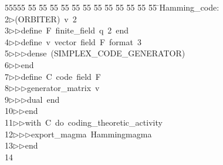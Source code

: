%
%
\begin{tabbing}
55555 \= 55 \= 55 \= 55 \= 55 \= 55 \= 55 \= 55 \= 55 \= 55 \= 55 \= 55 \= 55 \= \>Hamming\_code:\\[0pt]
2\>$\triangleright$\>(ORBITER)\ v\ 2\ \\[0pt]
3\>$\triangleright$\>$\triangleright$\>define\ F\ finite\_field\ q\ 2\ end\ \\[0pt]
4\>$\triangleright$\>$\triangleright$\>define\ v\ vector\ field\ F\ format\ 3\ \\[0pt]
5\>$\triangleright$\>$\triangleright$\>$\triangleright$\>dense\ (SIMPLEX\_CODE\_GENERATOR)\ \\[0pt]
6\>$\triangleright$\>$\triangleright$\>end\ \\[0pt]
7\>$\triangleright$\>$\triangleright$\>define\ C\ code\ field\ F\ \\[0pt]
8\>$\triangleright$\>$\triangleright$\>$\triangleright$\>generator\_matrix\ v\ \\[0pt]
9\>$\triangleright$\>$\triangleright$\>$\triangleright$\>dual\ end\ \\[0pt]
10\>$\triangleright$\>$\triangleright$\>end\ \\[0pt]
11\>$\triangleright$\>$\triangleright$\>with\ C\ do\ coding\_theoretic\_activity\ \\[0pt]
12\>$\triangleright$\>$\triangleright$\>$\triangleright$\>export\_magma\ Hammingmagma\ \\[0pt]
13\>$\triangleright$\>$\triangleright$\>end\ \\[0pt]
14\>\end{tabbing}
